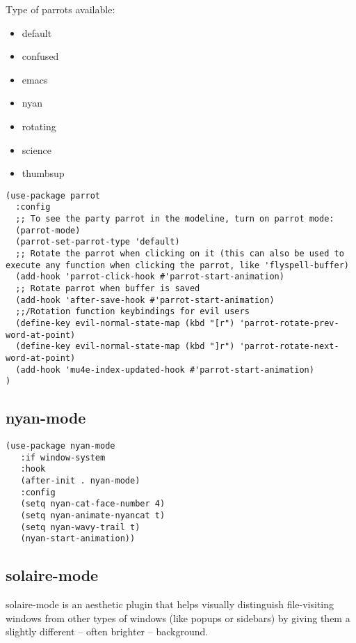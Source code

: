 \documentclass[11pt]{article}
\begin{document}
Type of parrots available:

\begin{itemize}
\item default
\item confused
\item emacs
\item nyan
\item rotating
\item science
\item thumbsup
\end{itemize}

\begin{verbatim}
(use-package parrot
  :config
  ;; To see the party parrot in the modeline, turn on parrot mode:
  (parrot-mode)
  (parrot-set-parrot-type 'default)
  ;; Rotate the parrot when clicking on it (this can also be used to execute any function when clicking the parrot, like 'flyspell-buffer)
  (add-hook 'parrot-click-hook #'parrot-start-animation)
  ;; Rotate parrot when buffer is saved
  (add-hook 'after-save-hook #'parrot-start-animation)
  ;;/Rotation function keybindings for evil users
  (define-key evil-normal-state-map (kbd "[r") 'parrot-rotate-prev-word-at-point)
  (define-key evil-normal-state-map (kbd "]r") 'parrot-rotate-next-word-at-point)
  (add-hook 'mu4e-index-updated-hook #'parrot-start-animation)
)
\end{verbatim}

\subsection*{nyan-mode}
\label{sec:org67f02dd}

\begin{verbatim}
(use-package nyan-mode
   :if window-system
   :hook
   (after-init . nyan-mode)
   :config
   (setq nyan-cat-face-number 4)
   (setq nyan-animate-nyancat t)
   (setq nyan-wavy-trail t)
   (nyan-start-animation))
\end{verbatim}

\subsection*{solaire-mode}
\label{sec:org212fc60}

solaire-mode is an aesthetic plugin that helps visually distinguish
file-visiting windows from other types of windows (like popups or sidebars)
by giving them a slightly different -- often brighter -- background.
\end{document}

